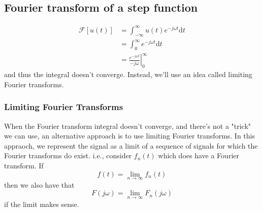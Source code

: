 \documentclass[10pt]{article}
\newcommand{\fourier}{\mathcal{F}}
\newcommand{\absint}{\int_{-\infty}^\infty}
\newcommand{\dd}{\text{d}}
\begin{document}
\subsection*{Fourier transform of a step function}
\begin{align*}
    \fourier[u(t)] &= \absint u(t) e^{-j\omega t} \dd t\\
    &= \int_0^\infty e^{-j\omega t} \dd t\\
    &= \left.\frac{e^{-j\omega t}}{-j\omega}\right|_0^\infty
\end{align*}
and thus the integral doesn't converge.  Instead, we'll use an idea called limiting Fourier transforms.

\subsubsection*{Limiting Fourier Transforms}
When the Fourier transform integral doesn't converge, and there's not a "trick" we can use, an alternative approach is to use limiting Fourier transforms.  In this appraoch, we represent the signal as a limit of a sequence of signals for which the Fourier transforms do exist.  i.e., consider $f_n(t)$ which does have a Fourier transform.  If
\[f(t) = \lim_{n\rightarrow \infty}f_n(t)\]
then we also have that 
\[F(j\omega) = \lim_{n \rightarrow \infty}F_n(j\omega)\]
if the limit makes sense.
\end{document}
